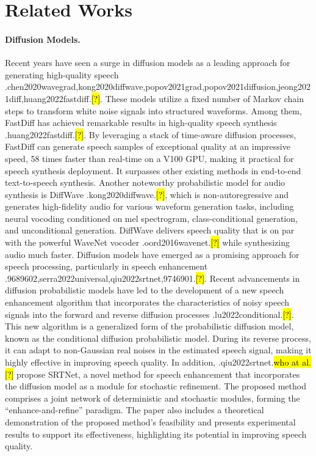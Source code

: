\documentclass{article}
\let\realcite\cite
\renewcommand{\cite}[1]{\ifx.#1.\hl{[?]}\else\realcite{#1}\fi}
\let\realcitet\citet
\renewcommand{\citet}[1]{\ifx.#1.\hl{who at al. [?]}\else\realcitet{#1}\fi}
\begin{document}
\section{Related Works}
\paragraph{Diffusion Models.}
Recent years have seen a surge in diffusion models as a leading approach for generating high-quality speech \cite{chen2020wavegrad,kong2020diffwave,popov2021grad,popov2021diffusion,jeong2021diff,huang2022fastdiff}. These models utilize a fixed number of Markov chain steps to transform white noise signals into structured waveforms. Among them, FastDiff has achieved remarkable results in high-quality speech synthesis \cite{huang2022fastdiff}. By leveraging a stack of time-aware diffusion processes, FastDiff can generate speech samples of exceptional quality at an impressive speed, 58 times faster than real-time on a V100 GPU, making it practical for speech synthesis deployment. It surpasses other existing methods in end-to-end text-to-speech synthesis. Another noteworthy probabilistic model for audio synthesis is DiffWave \cite{kong2020diffwave}, which is non-autoregressive and generates high-fidelity audio for various waveform generation tasks, including neural vocoding conditioned on mel spectrogram, class-conditional generation, and unconditional generation. DiffWave delivers speech quality that is on par with the powerful WaveNet vocoder \cite{oord2016wavenet} while synthesizing audio much faster.
Diffusion models have emerged as a promising approach for speech processing, particularly in speech enhancement \cite{9689602,serra2022universal,qiu2022srtnet,9746901}. Recent advancements in diffusion probabilistic models have led to the development of a new speech enhancement algorithm that incorporates the characteristics of noisy speech signals into the forward and reverse diffusion processes \cite{lu2022conditional}. This new algorithm is a generalized form of the probabilistic diffusion model, known as the conditional diffusion probabilistic model. During its reverse process, it can adapt to non-Gaussian real noises in the estimated speech signal, making it highly effective in improving speech quality.
In addition, \citet{qiu2022srtnet} propose SRTNet, a novel method for speech enhancement that incorporates the diffusion model as a module for stochastic refinement. The proposed method comprises a joint network of deterministic and stochastic modules, forming the “enhance-and-refine” paradigm. The paper also includes a theoretical demonstration of the proposed method’s feasibility and presents experimental results to support its effectiveness, highlighting its potential in improving speech quality. 
\end{document}
